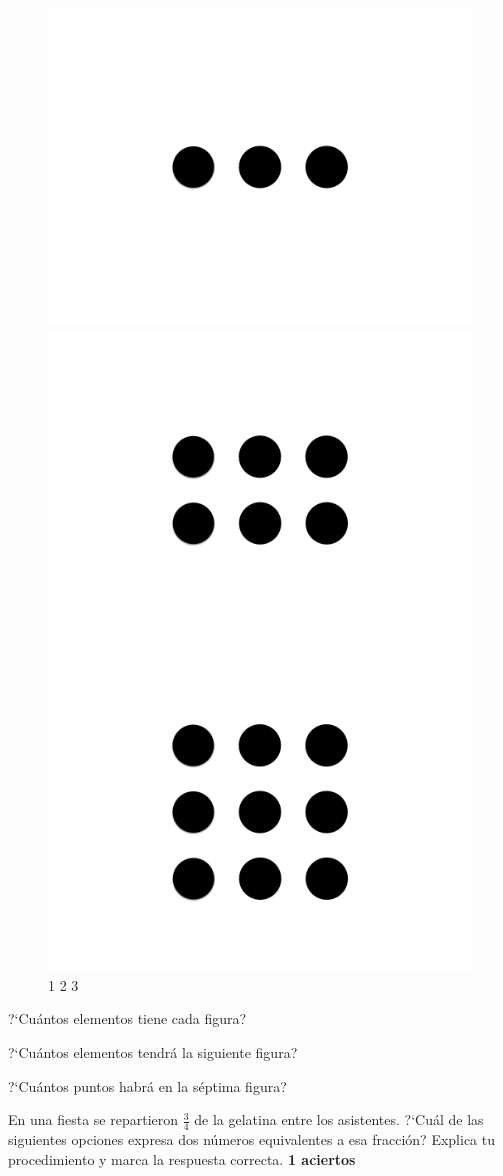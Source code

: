 \documentclass[11pt]{article}
\begin{document}
\begin{figure}[h]
    \centering
    \includegraphics[width=0.17\linewidth]{figures004.png}
    \includegraphics[width=0.17\linewidth]{figures005.png}
    \includegraphics[width=0.17\linewidth]{figures006.png}\\
    1 \hspace{2.5cm} 2 \hspace{2.5cm} 3
\end{figure}

?`Cu\'antos elementos tiene cada figura?

\vspace{1cm}

?`Cu\'antos elementos tendr\'a la siguiente figura?

\vspace{1cm}

?`Cu\'antos puntos habr\'a en la s\'eptima figura?

\vspace{1cm}

\vspace{1cm}

En una fiesta se repartieron $\frac{3}{4}$ de la gelatina entre los asistentes.
?`Cu\'al de las siguientes opciones expresa dos n\'umeros equivalentes a esa
fracci\'on? Explica tu procedimiento y marca la respuesta correcta.  \hfill \textbf{1 aciertos}
\end{document}
